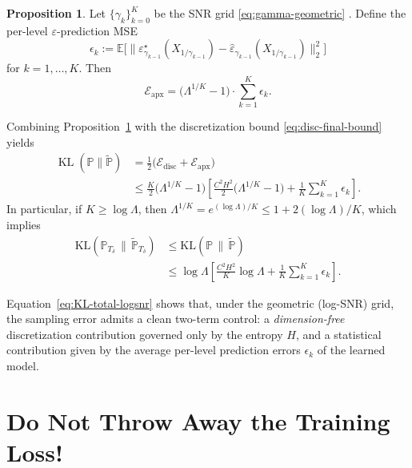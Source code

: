 \documentclass[11pt]{article}
\theoremstyle{definition}
\newtheorem{proposition}{Proposition}
\DeclareMathOperator{\KL}{\mathrm{KL}}
\newcommand{\E}{\mathbb{E}}
\numberwithin{equation}{section}
\begin{document}
\begin{proposition}\label{prop:Eapprox-logsnr}
Let $\{\gamma_k\}_{k=0}^K$ be the SNR grid \eqref{eq:gamma-geometric} .
Define the per-level $\varepsilon$-prediction MSE
\[
\epsilon_k
:=
\E\Big[\big\|\varepsilon_{\gamma_{k-1}}^\star(X_{1/\gamma_{k-1}})
-\hat\varepsilon_{\gamma_{k-1}}(X_{1/\gamma_{k-1}})\big\|_2^2\Big]
\]
for $ k=1,\dots,K.$ Then
\begin{equation}\label{eq:Eapprox-logsnr}
\mathcal E_{\mathrm{apx}}
=
\big(\Lambda^{1/K}-1\big)\cdot \sum_{k=1}^K \epsilon_k.
\end{equation}
\end{proposition}

Combining Proposition~\ref{prop:Eapprox-logsnr} with the discretization bound \eqref{eq:disc-final-bound} %
yields
\begingroup
\small
\begin{align*}
\KL(\mathbb P\|\tilde{\mathbb P})
 & =\frac12\big(\mathcal E_{\mathrm{disc}}+\mathcal E_{\mathrm{apx}}\big) \nonumber  \\ 
& \le
\frac{K}{2}\big(\Lambda^{1/K}-1\big)
\left[
\frac{C^2H^2}{2}\big(\Lambda^{1/K}-1\big)
+\frac{1}{K}\sum_{k=1}^K \epsilon_k
\right].
\end{align*}
\endgroup
In particular, if $K\ge \log \Lambda$, then $\Lambda^{1/K} = e^{(\log \Lambda)/K}\le 1+2(\log \Lambda)/K$, which implies
\begingroup
\small
\begin{align}
\mathrm{KL}(\mathbb{P}_{T_\delta}\,\|\,\tilde{\mathbb{P}}_{T_\delta})
&\le
\mathrm{KL}(\mathbb{P}\,\|\,\tilde{\mathbb{P}})\nonumber\\ 
&\leq \log \Lambda
\left[
\frac{C^2H^2}{K}\log \Lambda
+\frac{1}{K}\sum_{k=1}^K \epsilon_k
\right] \label{eq:KL-total-logsnr}.
\end{align}
\endgroup

Equation~\eqref{eq:KL-total-logsnr} shows that, under the geometric (log-SNR) grid, the sampling error admits a clean
two-term control: a \emph{dimension-free} discretization contribution governed only by the entropy $H$, and a
statistical contribution given by the average per-level prediction errors $\epsilon_k$ of the learned model.


\section{Do Not Throw Away the Training Loss!}

\end{document}

